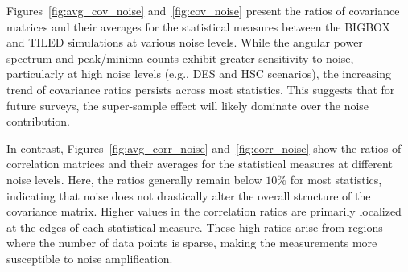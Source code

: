 Figures~\ref{fig:avg_cov_noise} and~\ref{fig:cov_noise} present the ratios of covariance matrices and their averages for the statistical measures between the BIGBOX and TILED simulations at various noise levels. While the angular power spectrum and peak/minima counts exhibit greater sensitivity to noise, particularly at high noise levels (e.g., DES and HSC scenarios), the increasing trend of covariance ratios persists across most statistics. This suggests that for future surveys, the super-sample effect will likely dominate over the noise contribution.

In contrast, Figures~\ref{fig:avg_corr_noise} and~\ref{fig:corr_noise} show the ratios of correlation matrices and their averages for the statistical measures at different noise levels. Here, the ratios generally remain below $10\%$ for most statistics, indicating that noise does not drastically alter the overall structure of the covariance matrix. Higher values in the correlation ratios are primarily localized at the edges of each statistical measure. These high ratios arise from regions where the number of data points is sparse, making the measurements more susceptible to noise amplification. 

